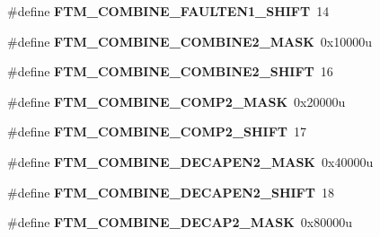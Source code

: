 \begin{DoxyCompactItemize}
\item 
\#define {\bfseries F\+T\+M\+\_\+\+C\+O\+M\+B\+I\+N\+E\+\_\+\+F\+A\+U\+L\+T\+E\+N1\+\_\+\+S\+H\+I\+FT}~14\hypertarget{group__FTM__Register__Masks_gaf889dddf3bfe69e1fde16e5386ab5204}{}\label{group__FTM__Register__Masks_gaf889dddf3bfe69e1fde16e5386ab5204}

\item 
\#define {\bfseries F\+T\+M\+\_\+\+C\+O\+M\+B\+I\+N\+E\+\_\+\+C\+O\+M\+B\+I\+N\+E2\+\_\+\+M\+A\+SK}~0x10000u\hypertarget{group__FTM__Register__Masks_gaf6def48c41b38acef5263e8d8f440901}{}\label{group__FTM__Register__Masks_gaf6def48c41b38acef5263e8d8f440901}

\item 
\#define {\bfseries F\+T\+M\+\_\+\+C\+O\+M\+B\+I\+N\+E\+\_\+\+C\+O\+M\+B\+I\+N\+E2\+\_\+\+S\+H\+I\+FT}~16\hypertarget{group__FTM__Register__Masks_ga9ec484c5c6125951d7528fe755040d09}{}\label{group__FTM__Register__Masks_ga9ec484c5c6125951d7528fe755040d09}

\item 
\#define {\bfseries F\+T\+M\+\_\+\+C\+O\+M\+B\+I\+N\+E\+\_\+\+C\+O\+M\+P2\+\_\+\+M\+A\+SK}~0x20000u\hypertarget{group__FTM__Register__Masks_gaf15b9cb1ec9fce30f4442d387e6e6c11}{}\label{group__FTM__Register__Masks_gaf15b9cb1ec9fce30f4442d387e6e6c11}

\item 
\#define {\bfseries F\+T\+M\+\_\+\+C\+O\+M\+B\+I\+N\+E\+\_\+\+C\+O\+M\+P2\+\_\+\+S\+H\+I\+FT}~17\hypertarget{group__FTM__Register__Masks_ga6f9c535470be4fce32ae6edc8a9fd54a}{}\label{group__FTM__Register__Masks_ga6f9c535470be4fce32ae6edc8a9fd54a}

\item 
\#define {\bfseries F\+T\+M\+\_\+\+C\+O\+M\+B\+I\+N\+E\+\_\+\+D\+E\+C\+A\+P\+E\+N2\+\_\+\+M\+A\+SK}~0x40000u\hypertarget{group__FTM__Register__Masks_ga38101c934966b16d7394e32a393a5adf}{}\label{group__FTM__Register__Masks_ga38101c934966b16d7394e32a393a5adf}

\item 
\#define {\bfseries F\+T\+M\+\_\+\+C\+O\+M\+B\+I\+N\+E\+\_\+\+D\+E\+C\+A\+P\+E\+N2\+\_\+\+S\+H\+I\+FT}~18\hypertarget{group__FTM__Register__Masks_ga63c12c9b713d5078d861e14c2d34aea6}{}\label{group__FTM__Register__Masks_ga63c12c9b713d5078d861e14c2d34aea6}

\item 
\#define {\bfseries F\+T\+M\+\_\+\+C\+O\+M\+B\+I\+N\+E\+\_\+\+D\+E\+C\+A\+P2\+\_\+\+M\+A\+SK}~0x80000u\hypertarget{group__FTM__Register__Masks_ga94d0092dd5448a53c187d23ab9f7c52a}{}\label{group__FTM__Register__Masks_ga94d0092dd5448a53c187d23ab9f7c52a}


\end{DoxyCompactItemize}
